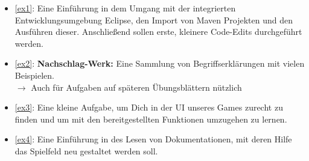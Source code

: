 \begin{itemize}
	\item \ref{ex1}: Eine Einführung in dem Umgang mit der integrierten Entwicklungsumgebung Eclipse, den Import von Maven Projekten und den Ausführen dieser. Anschließend sollen erste, kleinere Code-Edits durchgeführt werden.
	\item \ref{ex2}: \textbf{Nachschlag-Werk:} Eine Sammlung von Begriffserklärungen mit vielen Beispielen.\\
	$\rightarrow$ Auch für Aufgaben auf späteren Übungsblättern nützlich
	\item \ref{ex3}: Eine kleine Aufgabe, um Dich in der UI unseres Games zurecht zu finden und um mit den bereitgestellten Funktionen umzugehen zu lernen.
	\item \ref{ex4}: Eine Einführung in des Lesen von Dokumentationen, mit deren Hilfe das Spielfeld neu gestaltet werden soll.
\end{itemize}
\newpage